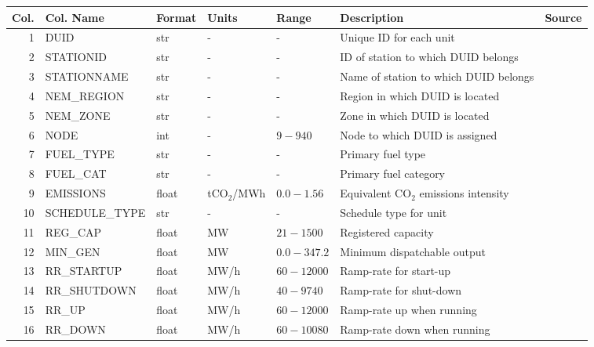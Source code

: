 \begin{table}
\begin{threeparttable}
\centering
\small\begin{tabular}{rllllll}
\toprule
 Col. &                     Col. Name & Format &          Units &        Range &                                                Description &                 Source\tnote{$\dagger$} \\
\midrule
 1 &  DUID &  str &  - &  - &  Unique ID for each unit &  \cite{aemo_data_2018} \\
 2 &  STATIONID &  str &  - &  - &  ID of station to which DUID belongs &  \cite{aemo_data_2018} \\
 3 &  STATIONNAME &  str &  - &  - &  Name of station to which DUID belongs &  \cite{aemo_data_2018} \\
 4 &  NEM\_REGION &  str &  - &  - &  Region in which DUID is located &   \\
 5 &  NEM\_ZONE &  str &  - &  - &  Zone in which DUID is located &   \\
 6 &  NODE &  int &  - &  $9-940$ &  Node to which DUID is assigned &   \\
 7 &  FUEL\_TYPE &  str &  - &  - &  Primary fuel type &  \cite{aemo_data_2018} \\
 8 &  FUEL\_CAT &  str &  - &  - &  Primary fuel category &   \\
 9 &  EMISSIONS &  float &  tCO$_{2}$/MWh &  $0.0-1.56$ &  Equivalent CO$_{2}$ emissions intensity &  \cite{aemo_current_2018} \\
 10 &  SCHEDULE\_TYPE &  str &  - &  - &  Schedule type for unit &  \cite{aemo_data_2018} \\
 11 &  REG\_CAP &  float &  MW &  $21-1500$ &  Registered capacity &  \cite{aemo_data_2018} \\
 12 &  MIN\_GEN &  float &  MW &  $0.0-347.2$ &  Minimum dispatchable output &  \cite{aemo_data_2018, aemo_ntndp_2018} \\
 13 &  RR\_STARTUP &  float &  MW/h &  $60-12000$ &  Ramp-rate for start-up &  \cite{aemo_ntndp_2018} \\
 14 &  RR\_SHUTDOWN &  float &  MW/h &  $40-9740$ &  Ramp-rate for shut-down &  \cite{aemo_ntndp_2018} \\
 15 &  RR\_UP &  float &  MW/h &  $60-12000$ &  Ramp-rate up when running &  \cite{aemo_ntndp_2018} \\
 16 &  RR\_DOWN &  float &  MW/h &  $60-10080$ &  Ramp-rate down when running &  \cite{aemo_ntndp_2018} \\

\end{tabular}
\end{threeparttable}
\end{table}
